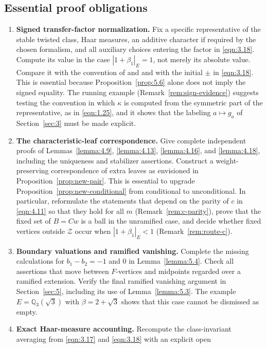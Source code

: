 \documentclass[12pt,letterpaper]{amsart}
\numberwithin{equation}{section}
\theoremstyle{definition}
\theoremstyle{plain}
\begin{document}
\subsection{Essential proof obligations}
\begin{enumerate}
\item\textbf{Signed transfer-factor normalization.}
Fix a specific representative of the stable twisted class, Haar
measures, an additive character if required by the chosen formalism,
and all auxiliary choices entering the factor in
\eqref{eqn:3.18}. Compute its value in the case
$|1+\beta_1|_E=1$, not merely its absolute value. Compare it with
the convention of \cite{KS99} and \cite{LS87} and with the initial
$\pm$ in \eqref{eqn:3.18}. This is essential because
Proposition~\ref{prop:5.6} alone does not imply the signed equality.
The running example (Remark~\ref{rem:sign-evidence}) suggests testing
the convention in which $\kappa$ is computed from the symmetric part
of the representative, as in \eqref{eqn:1.25}, and it shows that the
labeling $a\mapsto g_a$ of Section~\ref{sec:3} must be made explicit.
\item\textbf{The characteristic-leaf correspondence.}
Give complete independent proofs of Lemmas~\ref{lemma:4.9},
\ref{lemma:4.13}, \ref{lemma:4.16}, and \ref{lemma:4.18},
including the uniqueness and stabilizer assertions. Construct a
weight-preserving correspondence of extra leaves as envisioned in
Proposition~\ref{prop:new-pair}. This is essential to upgrade
Proposition~\ref{prop:new-conditional} from conditional to unconditional.
In particular, reformulate the statements that depend on the parity of
$c$ in \eqref{eqn:4.11} so that they hold for all $m$
(Remark~\ref{rem:c-parity}), prove that the fixed set of $B=Cw$ is a
ball in the unramified case, and decide whether fixed vertices outside
$\mathcal Z$ occur when $|1+\beta_1|_E<1$ (Remark~\ref{rem:route-c}).
\item\textbf{Boundary valuations and ramified vanishing.}
Complete the missing calculations for $b_1-b_2=-1$ and $0$ in
Lemma~\ref{lemma:5.4}. Check all assertions that move between
$F$-vertices and midpoints regarded over a ramified extension.
Verify the final ramified vanishing argument in Section~\ref{sec:5},
including its use of Lemma~\ref{lemma:5.3}. The example
$E=\mathbb Q_3(\sqrt3)$ with $\beta=2+\sqrt3$ shows that
this case cannot be dismissed as empty.
\item\textbf{Exact Haar-measure accounting.}
Recompute the class-invariant averaging from
\eqref{eqn:3.17} and \eqref{eqn:3.18} with an explicit open

\end{enumerate}
\end{document}
